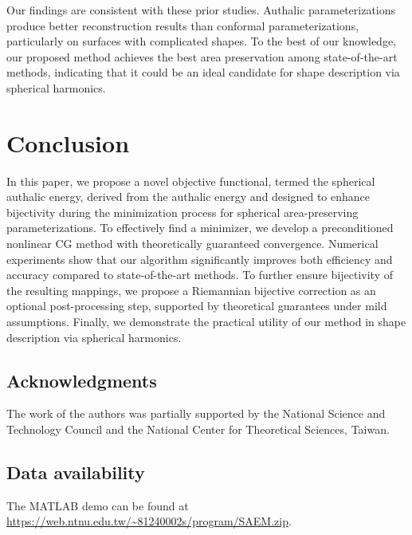 \documentclass{article}
\numberwithin{equation}{section}
\begin{document}
Our findings are consistent with these prior studies. Authalic parameterizations produce better reconstruction results than conformal parameterizations, particularly on surfaces with complicated shapes. To the best of our knowledge, our proposed method achieves the best area preservation among state-of-the-art methods, indicating that it could be an ideal candidate for shape description via spherical harmonics.

\section{Conclusion}
\label{sec:9}

In this paper, we propose a novel objective functional, termed the spherical authalic energy, derived from the authalic energy and designed to enhance bijectivity during the minimization process for spherical area-preserving parameterizations. To effectively find a minimizer, we develop a preconditioned nonlinear CG method with theoretically guaranteed convergence. Numerical experiments show that our algorithm significantly improves both efficiency and accuracy compared to state-of-the-art methods. To further ensure bijectivity of the resulting mappings, we propose a Riemannian bijective correction as an optional post-processing step, supported by theoretical guarantees under mild assumptions. Finally, we demonstrate the practical utility of our method in shape description via spherical harmonics.

\subsection*{Acknowledgments}
The work of the authors was partially supported by the National Science and Technology Council and the National Center for Theoretical Sciences, Taiwan.

\subsection*{Data availability}
The MATLAB demo can be found at \url{https://web.ntnu.edu.tw/~81240002s/program/SAEM.zip}.

\footnotesize




\end{document}
